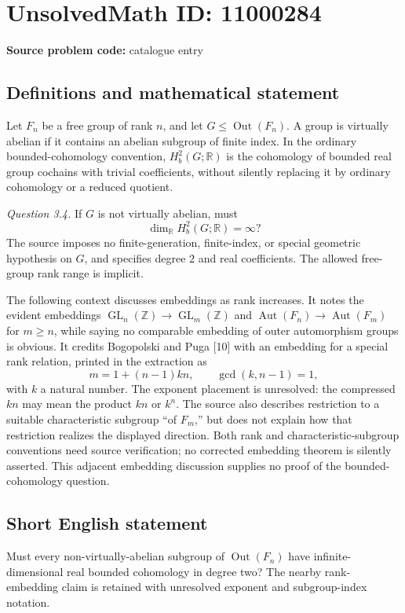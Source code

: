 \documentclass[11pt]{article}
\newcommand{\Z}{\mathbb{Z}}
\newcommand{\R}{\mathbb{R}}
\begin{document}
\section*{UnsolvedMath ID: 11000284}
\textbf{Source problem code:} catalogue entry
\subsection{Definitions and mathematical statement}
Let \(F_n\) be a free group of rank \(n\), and let \(G\leq\operatorname{Out}(F_n)\). A group is virtually abelian if it contains an abelian subgroup of finite index. In the ordinary bounded-cohomology convention, \(H_b^2(G;\R)\) is the cohomology of bounded real group cochains with trivial coefficients, without silently replacing it by ordinary cohomology or a reduced quotient.

\emph{Question 3.4.} If \(G\) is not virtually abelian, must
\[
 \dim_\R H_b^2(G;\R)=\infty?
\]
The source imposes no finite-generation, finite-index, or special geometric hypothesis on \(G\), and specifies degree \(2\) and real coefficients. The allowed free-group rank range is implicit.

The following context discusses embeddings as rank increases. It notes the evident embeddings \(\operatorname{GL}_n(\Z)\to\operatorname{GL}_m(\Z)\) and \(\operatorname{Aut}(F_n)\to\operatorname{Aut}(F_m)\) for \(m\geq n\), while saying no comparable embedding of outer automorphism groups is obvious. It credits Bogopolski and Puga [10] with an embedding for a special rank relation, printed in the extraction as
\[
 m=1+(n-1)kn,\qquad \gcd(k,n-1)=1,
\]
with \(k\) a natural number. The exponent placement is unresolved: the compressed \(kn\) may mean the product \(kn\) or \(k^n\). The source also describes restriction to a suitable characteristic subgroup ``of \(F_m\),'' but does not explain how that restriction realizes the displayed direction. Both rank and characteristic-subgroup conventions need source verification; no corrected embedding theorem is silently asserted. This adjacent embedding discussion supplies no proof of the bounded-cohomology question.
\subsection{Short English statement}
Must every non-virtually-abelian subgroup of \(\operatorname{Out}(F_n)\) have infinite-dimensional real bounded cohomology in degree two? The nearby rank-embedding claim is retained with unresolved exponent and subgroup-index notation.
\end{document}

